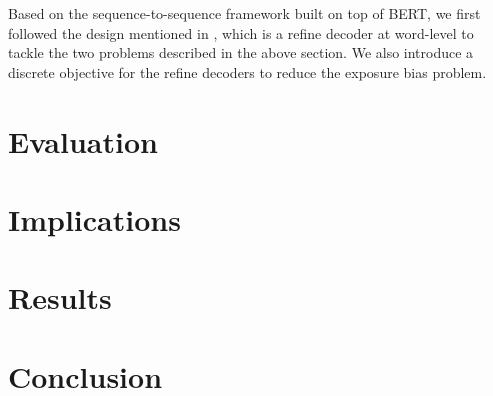 \documentclass[twoside,twocolumn]{article}
\begin{document}
Based on the sequence-to-sequence framework built on top
of BERT, we first followed the design mentioned in \cite{zhang2019pretraining}, which is a refine decoder at word-level to tackle the two problems 
described in the above section. We also introduce a discrete objective for the refine decoders to reduce the exposure bias problem.


\section{Evaluation}

\section{Implications}

\section{Results}



\section{Conclusion}






\printbibliography

  

\end{document}
